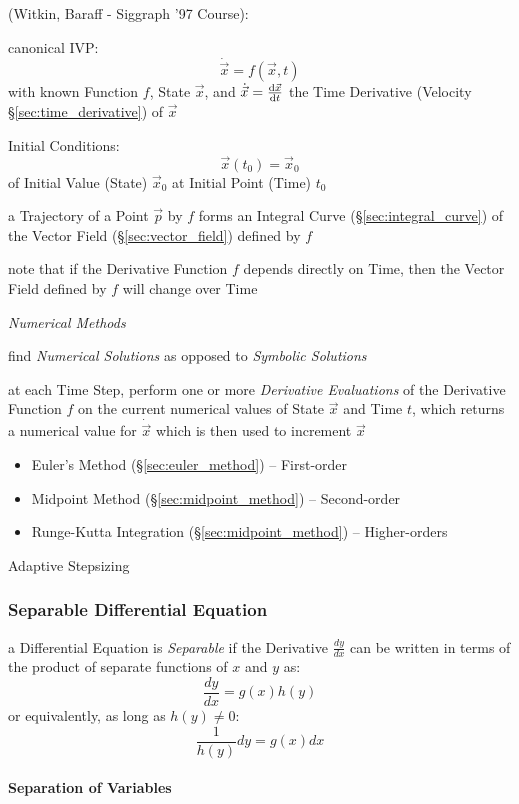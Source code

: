 (Witkin, Baraff - Siggraph '97 Course):

canonical IVP:
\[
  \dot{\vec{x}} = f(\vec{x}, t)
\]
with known Function $f$, State $\vec{x}$, and $\dot{\vec{x}} =
\frac{\mathrm{d}\vec{x}}{\mathrm{d}t}$ the Time Derivative (Velocity \S\ref{sec:time_derivative})
of $\vec{x}$

Initial Conditions:
\[
  \vec{x}(t_0) = \vec{x}_0
\]
of Initial Value (State) $\vec{x}_0$ at Initial Point (Time) $t_0$

a Trajectory of a Point $\vec{p}$ by $f$ forms an Integral Curve
(\S\ref{sec:integral_curve}) of the Vector Field (\S\ref{sec:vector_field})
defined by $f$

note that if the Derivative Function $f$ depends directly on Time, then the
Vector Field defined by $f$ will change over Time

\emph{Numerical Methods}

find \emph{Numerical Solutions} as opposed to \emph{Symbolic Solutions}

at each Time Step, perform one or more \emph{Derivative Evaluations} of the
Derivative Function $f$ on the current numerical values of State $\vec{x}$ and
Time $t$, which returns a numerical value for $\dot{\vec{x}}$ which is then used
to increment $\vec{x}$

\begin{itemize}
\item Euler's Method (\S\ref{sec:euler_method}) -- First-order
\item Midpoint Method (\S\ref{sec:midpoint_method}) -- Second-order
\item Runge-Kutta Integration (\S\ref{sec:midpoint_method}) -- Higher-orders
\end{itemize}

Adaptive Stepsizing



\subsubsection{Separable Differential Equation}\label{sec:separable}

a Differential Equation is \emph{Separable} if the Derivative $\frac{dy}{dx}$
can be written in terms of the product of separate functions of $x$ and $y$ as:
\[
  \frac{dy}{dx} = g(x)h(y)
\]
or equivalently, as long as $h(y) \neq 0$:
\[
  \frac{1}{h(y)} dy = g(x) dx
\]



\paragraph{Separation of Variables}\label{sec:separation_of_variables}\hfill

